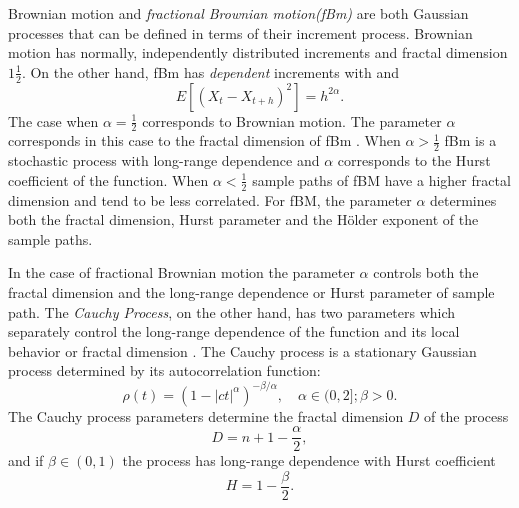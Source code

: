 Brownian motion and \textit{fractional Brownian motion(fBm)} 
are both Gaussian processes that can be defined in terms of their increment process. 
Brownian motion has normally, independently 
distributed increments and fractal dimension 
$1 \frac{1}{2}$. On the other hand, fBm has 
 \textit{dependent} increments with
 and
\[
  E[(X_{t} - X_{t +h} )^2] = h^{2\alpha}.
\]
The case when $\alpha = \frac{1}{2}$ corresponds to 
Brownian motion. The parameter $\alpha$ 
corresponds in this case to the fractal dimension of 
fBm \cite{falconer2003}. When $\alpha > \frac{1}{2}$ fBm is a stochastic process with long-range dependence and $\alpha$ corresponds
to the Hurst coefficient of the function. When 
$\alpha < \frac{1}{2}$ sample paths of fBM have a 
higher fractal dimension and tend to be less correlated.
For fBM, the parameter $\alpha$ determines both 
the fractal dimension, Hurst parameter and the 
H\"older exponent of the sample paths.

In the case of fractional Brownian motion the parameter 
$\alpha$ controls both the fractal dimension and the
long-range dependence or Hurst parameter of sample path. 
The \textit{Cauchy Process}, 
on the other hand, has two parameters which separately control 
the long-range dependence of the function 
and its local behavior or fractal dimension \cite{gneiting2004}.
The Cauchy process is a stationary Gaussian process determined by
 its autocorrelation function:
\[
   \rho(t) =  (1 - |ct|^{\alpha})^{-\beta/\alpha}, 
   \hspace{1em} \alpha \in (0,2]; \beta > 0.
\]
The Cauchy process parameters determine the fractal 
dimension $D$ of the  process 
  \[
    D = n + 1  - \frac{\alpha}{2},
  \]
  and if $\beta \in (0,1)$ the process has long-range 
  dependence with Hurst coefficient 
  \[
    H  =   1 - \frac{\beta}{2}.
  \]





